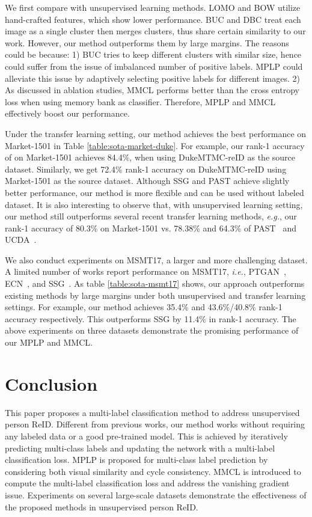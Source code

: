 \documentclass[10pt,twocolumn,letterpaper]{article}
\begin{document}
We first compare with unsupervised learning methods. LOMO and BOW utilize hand-crafted features, which show lower performance. BUC and DBC treat each image as a single cluster then merges clusters, thus share certain similarity to our work. However, our method outperforms them by large margins. The reasons could be because: 1) BUC tries to keep different clusters with similar size, hence could suffer from the issue of imbalanced number of positive labels. MPLP could alleviate this issue by adaptively selecting positive labels for different images. 2) As discussed in ablation studies, MMCL performs better than the cross entropy loss when using memory bank as classifier. Therefore, MPLP and MMCL effectively boost our performance.

Under the transfer learning setting, our method achieves the best performance on Market-1501 in Table \ref{table:sota-market-duke}. For example, our rank-1 accuracy of on Market-1501 achieves 84.4\%, when using DukeMTMC-reID as the source dataset. Similarly, we get 72.4\% rank-1 accuracy on DukeMTMC-reID using Market-1501 as the source dataset. Although SSG and PAST achieve slightly better performance, our method is more flexible and can be used without labeled dataset.  It is also interesting to observe that, with unsupervised learning setting, our method still outperforms several recent transfer learning methods, \emph{e.g.}, our rank-1 accuracy of 80.3\% on Market-1501 vs. 78.38\% and 64.3\% of PAST~\cite{Zhang_2019_ICCV} and UCDA~\cite{Qi_2019_ICCV}.

We also conduct experiments on MSMT17, a larger and more challenging dataset. A limited number of works report performance on MSMT17, \emph{i.e.}, PTGAN~\cite{wei2018person}, ECN~\cite{zhong2019invariance}, and SSG~\cite{Fu_2019_ICCV}. As table \ref{table:sota-msmt17} shows, our approach outperforms existing methods by large margins under both unsupervised and transfer learning settings. For example, our method achieves 35.4\% and 43.6\%/40.8\% rank-1 accuracy respectively. 
This outperforms SSG by 11.4\% in rank-1 accuracy. The above experiments on three datasets demonstrate the promising performance of our MPLP and MMCL.

\section{Conclusion}
This paper proposes a multi-label classification method to address unsupervised person ReID. Different from previous works, our method works without requiring any labeled data or a good pre-trained model. This is achieved by iteratively predicting multi-class labels and updating the network with a multi-label classification loss. MPLP is proposed for multi-class label prediction by considering both visual similarity and cycle consistency. MMCL is introduced to compute the multi-label classification loss and address the vanishing gradient issue. Experiments on several large-scale datasets demonstrate the effectiveness of the proposed methods in unsupervised person ReID.
\end{document}
